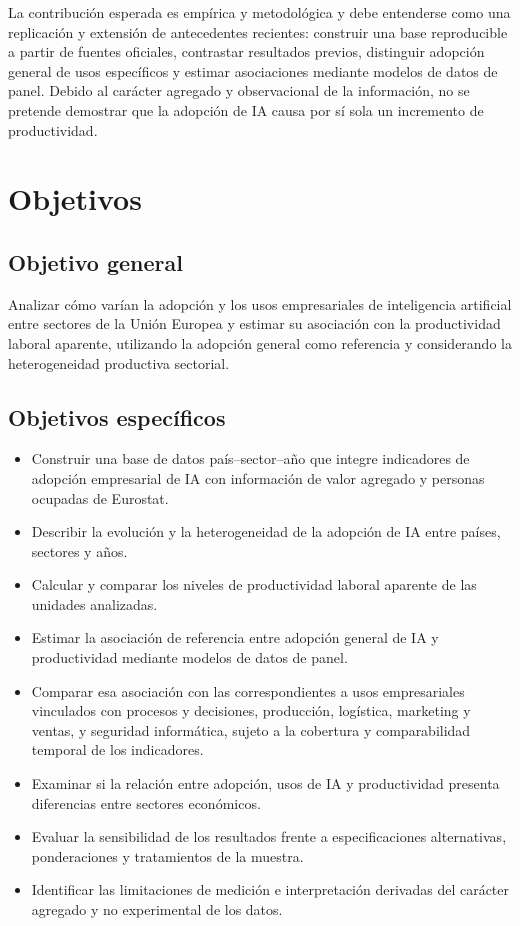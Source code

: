\documentclass[12pt,a4paper]{article}
\begin{document}
La contribución esperada es empírica y metodológica y debe entenderse como una replicación y extensión de antecedentes recientes: construir una base reproducible a partir de fuentes oficiales, contrastar resultados previos, distinguir adopción general de usos específicos y estimar asociaciones mediante modelos de datos de panel. Debido al carácter agregado y observacional de la información, no se pretende demostrar que la adopción de IA causa por sí sola un incremento de productividad.

\section{Objetivos}

\subsection{Objetivo general}

Analizar cómo varían la adopción y los usos empresariales de inteligencia artificial entre sectores de la Unión Europea y estimar su asociación con la productividad laboral aparente, utilizando la adopción general como referencia y considerando la heterogeneidad productiva sectorial.

\subsection{Objetivos específicos}

\begin{itemize}
  \item Construir una base de datos país--sector--año que integre indicadores de adopción empresarial de IA con información de valor agregado y personas ocupadas de Eurostat.
  \item Describir la evolución y la heterogeneidad de la adopción de IA entre países, sectores y años.
  \item Calcular y comparar los niveles de productividad laboral aparente de las unidades analizadas.
  \item Estimar la asociación de referencia entre adopción general de IA y productividad mediante modelos de datos de panel.
  \item Comparar esa asociación con las correspondientes a usos empresariales vinculados con procesos y decisiones, producción, logística, marketing y ventas, y seguridad informática, sujeto a la cobertura y comparabilidad temporal de los indicadores.
  \item Examinar si la relación entre adopción, usos de IA y productividad presenta diferencias entre sectores económicos.
  \item Evaluar la sensibilidad de los resultados frente a especificaciones alternativas, ponderaciones y tratamientos de la muestra.
  \item Identificar las limitaciones de medición e interpretación derivadas del carácter agregado y no experimental de los datos.
\end{itemize}
\end{document}
